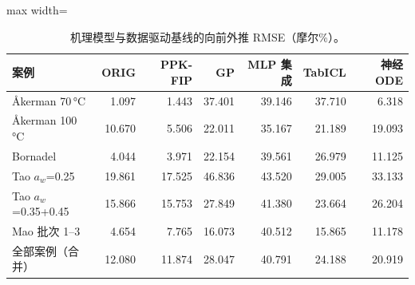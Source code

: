 \begin{table}[t]
\centering
\caption{机理模型与数据驱动基线的向前外推 RMSE（摩尔\%）。}\label{tab:fcstbb}
\footnotesize
\begin{adjustbox}{max width=\linewidth}
\begin{tabular}{lrrrrrr}
\toprule
案例 & ORIG & PPK-FIP & GP & MLP 集成 & TabICL & 神经 ODE \\
\midrule
Åkerman 70\,°C & 1.097 & 1.443 & 37.401 & 39.146 & 37.710 & 6.318 \\
Åkerman 100\,°C & 10.670 & 5.506 & 22.011 & 35.167 & 21.189 & 19.093 \\
Bornadel & 4.044 & 3.971 & 22.154 & 39.561 & 26.979 & 11.125 \\
Tao $a_w$=0.25 & 19.861 & 17.525 & 46.836 & 43.520 & 29.005 & 33.133 \\
Tao $a_w$=0.35+0.45 & 15.866 & 15.753 & 27.849 & 41.380 & 23.664 & 26.204 \\
Mao 批次 1--3 & 4.654 & 7.765 & 16.073 & 40.512 & 15.865 & 11.178 \\
\midrule
全部案例（合并） & 12.080 & 11.874 & 28.047 & 40.791 & 24.188 & 20.919 \\
\bottomrule
\end{tabular}
\end{adjustbox}
\end{table}
